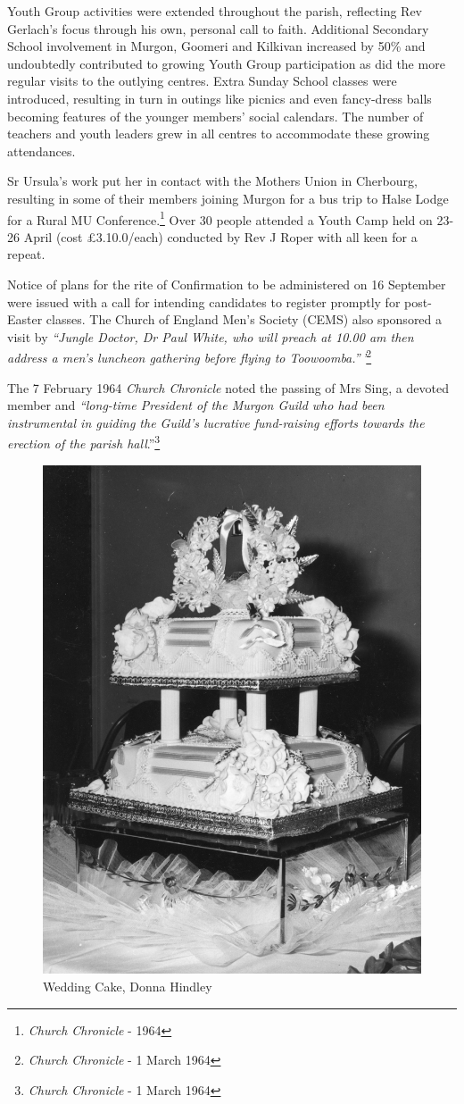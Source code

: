 Youth Group activities were extended throughout the parish, reflecting Rev Gerlach's focus through his own, personal call to faith. Additional Secondary School involvement in Murgon, Goomeri and Kilkivan increased by 50\% and undoubtedly contributed to growing Youth Group participation as did the more regular visits to the outlying centres. Extra Sunday School classes were introduced, resulting in turn in outings like picnics and even fancy-dress balls becoming features of the younger members' social calendars. The number of teachers and youth leaders grew in all centres to accommodate these growing attendances.



Sr Ursula's work put her in contact with the Mothers Union in Cherbourg, resulting in some of their members joining Murgon for a bus trip to Halse Lodge for a Rural MU Conference.\footnote{\emph{Church Chronicle} - 1964} Over 30 people attended a Youth Camp held on 23-26 April (cost \pounds3.10.0/each) conducted by Rev J Roper with all keen for a repeat.


Notice of plans for the rite of Confirmation to be administered on 16 September were issued with a call for intending candidates to register promptly for post-Easter classes. The Church of England Men's Society (CEMS) also sponsored a visit by \emph{``Jungle Doctor, Dr Paul White, who will preach at 10.00 am then address a men's luncheon gathering before flying to Toowoomba.''\,'}\footnote{\emph{Church Chronicle} - 1 March 1964}


The 7 February 1964 \emph{Church Chronicle} noted the passing of Mrs Sing, a devoted member and \emph{``long-time President of the Murgon Guild who had been instrumental in guiding the Guild's lucrative fund-raising efforts towards the erection of the parish hall}.''\footnote{\emph{Church Chronicle} - 1 March 1964}








\begin{figure}
\begin{center}
\includegraphics[width=.5\linewidth,center]{../images/donnaWeddingCake.jpg}
\caption{Wedding Cake, Donna Hindley}
\end{center}
\end{figure}




